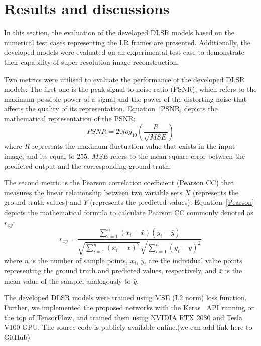 \section{Results and discussions}
In this section, the evaluation of the developed DLSR models based on the numerical test cases representing the LR frames are presented.
Additionally, the developed models were evaluated on an experimental test case to demonstrate their capability of super-resolution image reconstruction.

Two metrics were utilised to evaluate the performance of the developed DLSR models:
The first one is the peak signal-to-noise ratio (PSNR), which refers to the maximum possible power of a signal and the power of the distorting noise that affects the quality of its representation.
Equation~\ref{PSNR} depicts the mathematical representation of the PSNR:
\begin{equation}
	PSNR=20log_{10}\left(\frac{R}{\sqrt{MSE}}\right)
	\label{PSNR}
\end{equation}
where \(R\) represents the maximum fluctuation value that exists in the input image, and its equal to \(255\).
\(MSE\) refers to the mean square error between the predicted output and the corresponding ground truth.

The second metric is the Pearson correlation coefficient (Pearson CC) that measures the linear relationship between two variable sets \textbf{\(X\)} (represents the ground truth values) and \textbf{\(Y\)} (represents the predicted values).
Equation~\ref{Pearson} depicts the mathematical formula to calculate Pearson CC commonly denoted as \(r_{xy}\):
\begin{equation}
	r_{xy} = \frac{\sum_{i=1}^{n}(x_i - \bar{x})(y_i-\bar{y})}{\sqrt{\sum_{i=1}^{n}(x_i - \bar{x})^2}\sqrt{\sum_{i=1}^{n}(y_i - \bar{y})^2}}
	\label{Pearson}
\end{equation}
where \(n\) is the number of sample points, \(x_i\), \(y_i\) are the individual value points representing the ground truth and predicted values, respectively, and \(\bar{x}\) is the mean value of the sample, analogously to \(\bar{y}\).

The developed DLSR models were trained using MSE (L2 norm) loss function.
Further, we implemented the proposed networks with the Keras~\cite{chollet2015keras} API running on the top of TensorFlow, and trained them using NVIDIA RTX 2080 and Tesla V100 GPU. 
The source code is publicly available online.(we can add link here to GitHub)

